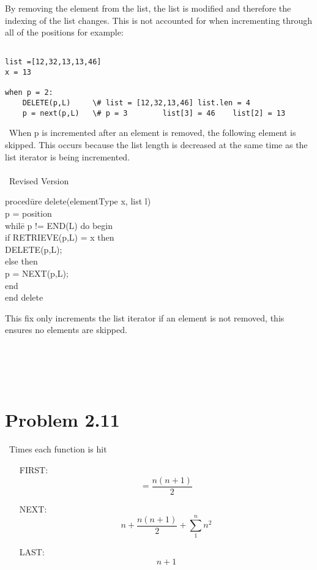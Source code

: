 \documentclass{article}
\begin{document}
By removing the element from the list, the list is modified and therefore the indexing of the list changes. This is not accounted for when incrementing through all of the positions
for example:
\begin{lstlisting}

list =[12,32,13,13,46]
x = 13

when p = 2:
	DELETE(p,L)		\# list = [12,32,13,46]	list.len = 4
	p = next(p,L)	\# p = 3		list[3] = 46	list[2] = 13

\end{lstlisting}
\ When p is incremented after an element is removed, the following element is skipped. This occurs because the list length is decreased at the same time as the list iterator is being
incremented.
	\\\\\ Revised Version
	\begin{algorithm}
\begin{tabbing}
 proced\=ure delete(elementType x, list l) \+ \\
	  p = position \\
	  whil\=e p != END(L) do begin \+ \\
		if RE\=TRIEVE(p,L) = x then \+\\
			DELETE(p,L); \-\\
		else then\+ \\  
		p = NEXT(p,L); \-\- \\
	 end\- \\
    end {delete} \\
\end{tabbing}
\end{algorithm}
This fix only increments the list iterator if an element is not removed, this ensures no elements are skipped.
\\\\\\\\\\


		\section{Problem 2.11}
		
		\ Times each function is hit\\
		\begin{enumerate}
			\item[FIRST:] 
			\begin{equation*}= \frac{n(n+1)}{2}	\end{equation*}
			\item[NEXT:] \begin{equation*} n+\frac{n(n+1)}{2}+\sum_{1}^{n}n^2\end{equation*}
						\item[LAST:] \begin{equation*} \end{equation*}
						\begin{equation*} n+1	\end{equation*}
		\end{enumerate}



	
\end{document}
